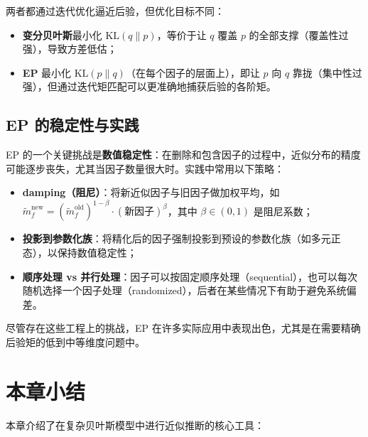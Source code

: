 \begin{Remark}[EP 与变分贝叶斯的区别]
两者都通过迭代优化逼近后验，但优化目标不同：
\begin{itemize}
\item \textbf{变分贝叶斯}最小化 $\text{KL}(q\|p)$，等价于让 $q$ 覆盖 $p$ 的全部支撑（覆盖性过强），导致方差低估；
\item \textbf{EP} 最小化 $\text{KL}(p\|q)$（在每个因子的层面上），即让 $p$ 向 $q$ 靠拢（集中性过强），但通过迭代矩匹配可以更准确地捕获后验的各阶矩。
\end{itemize}
\end{Remark}

\subsection{EP 的稳定性与实践}\label{sec:ep-stability}

EP 的一个关键挑战是\textbf{数值稳定性}：在删除和包含因子的过程中，近似分布的精度可能逐步丧失，尤其当因子数量很大时。实践中常用以下策略：

\begin{itemize}
\item \textbf{ damping（阻尼）}：将新近似因子与旧因子做加权平均，如 $\tilde{m}_f^{\text{new}} = (\tilde{m}_f^{\text{old}})^{1-\beta} \cdot (\text{新因子})^\beta$，其中 $\beta \in (0,1)$ 是阻尼系数；
\item \textbf{投影到参数化族}：将精化后的因子强制投影到预设的参数化族（如多元正态），以保持数值稳定性；
\item \textbf{顺序处理 vs 并行处理}：因子可以按固定顺序处理（sequential），也可以每次随机选择一个因子处理（randomized），后者在某些情况下有助于避免系统偏差。
\end{itemize}

尽管存在这些工程上的挑战，EP 在许多实际应用中表现出色，尤其是在需要精确后验矩的低到中等维度问题中。

\section{本章小结}

本章介绍了在复杂贝叶斯模型中进行近似推断的核心工具：

